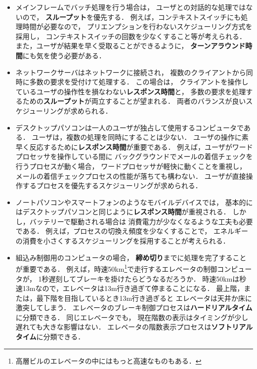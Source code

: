 \begin{itemize}
\item メインフレームでバッチ処理を行う場合は，
ユーザとの対話的な処理ではないので，
{\bf スループット}を優先する．
例えば，コンテキストスイッチにも処理時間が必要なので，
プリエンプションを行わないスケジューリング方式を採用し，
コンテキストスイッチの回数を少なくすること等が考えられる．
また，ユーザが結果を早く受取ることができるように，
{\bf ターンアラウンド時間}にも気を使う必要がある．

\item ネットワークサーバはネットワークに接続され，
複数のクライアントから同時に多数の要求を受付けて処理する．
この場合は，
クライアントを操作しているユーザの操作性を損なわない{\bf レスポンス時間}と，
多数の要求を処理するための{\bf スループット}が両立することが望まれる．
両者のバランスが良いスケジューリングが求められる．

\item デスクトップパソコンは一人のユーザが独占して使用するコンピュータである．
ユーザは，複数の処理を同時にすることは少ない．
ユーザの操作に素早く反応するために{\bf レスポンス時間}が重要である．
例えば，ユーザがワードプロセッサを操作している間に
バックグラウンドでメールの着信チェックを行うプロセスが動く場合，
ワードプロセッサが軽快に動くことを重視し，
メールの着信チェックプロセスの性能が落ちても構わない．
ユーザが直接操作するプロセスを優先するスケジューリングが求められる．

\item ノートパソコンやスマートフォンのようなモバイルデバイスでは，
基本的にはデスクトップパソコンと同じように{\bf レスポンス時間}が重視される．
しかし，バッテリーで駆動される場合は
消費電力が少なくなるような工夫も必要である．
例えば，プロセスの切換え頻度を少なくすることで，
エネルギーの消費を小さくするスケジューリングを採用することが考えられる．

\item 組込み制御用のコンピュータの場合，
{\bf 締め切り}までに処理を完了することが重要である．
例えば，時速50km\footnote{
高層ビルのエレベータの中にはもっと高速なものもある．
}で走行するエレベータの制御コンピュータが，
1秒遅刻してブレーキを掛けたらどうなるだろうか．
時速50kmは秒速13mなので，エレベータは13m行き過ぎて停まることになる．
最上階，または，最下階を目指しているとき13m行き過ぎると
エレベータは天井か床に激突してしまう．
エレベータのブレーキ制御プロセスは{\bf ハードリアルタイム}に分類できる．
同じエレベータでも，
現在階数の表示はタイミングが少し遅れても大きな影響はない．
エレベータの階数表示プロセスは{\bf ソフトリアルタイム}に分類できる．
\end{itemize}

